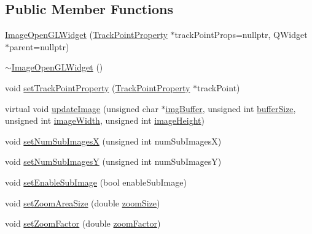\subsection*{Public Member Functions}
\begin{DoxyCompactItemize}
\item 
\mbox{\hyperlink{class_image_open_g_l_widget_a7d4da279a6dc2a37cdceb4d32233ecbd}{Image\+Open\+G\+L\+Widget}} (\mbox{\hyperlink{struct_track_point_property}{Track\+Point\+Property}} $\ast$track\+Point\+Props=nullptr, Q\+Widget $\ast$parent=nullptr)
\item 
\mbox{\hyperlink{class_image_open_g_l_widget_a3e1ff39cc67dc55a2240833810370aa7}{$\sim$\+Image\+Open\+G\+L\+Widget}} ()
\item 
void \mbox{\hyperlink{class_image_open_g_l_widget_a9f92b0518343d716a79e4f4958970b5f}{set\+Track\+Point\+Property}} (\mbox{\hyperlink{struct_track_point_property}{Track\+Point\+Property}} $\ast$track\+Point)
\item 
virtual void \mbox{\hyperlink{class_image_open_g_l_widget_abb7d20bc625fc370bf2757a9ec3c1ac3}{update\+Image}} (unsigned char $\ast$\mbox{\hyperlink{class_image_open_g_l_widget_a52ca337428d317ca2765cdf4d95e1b43}{img\+Buffer}}, unsigned int \mbox{\hyperlink{class_image_open_g_l_widget_a2c22ecc7b2355c66ed8d7ca6d824404e}{buffer\+Size}}, unsigned int \mbox{\hyperlink{class_image_open_g_l_widget_a8c3fbf15ba41c21741f8916079f5b6c3}{image\+Width}}, unsigned int \mbox{\hyperlink{class_image_open_g_l_widget_a30f0fce34d5d14972dce2c2d534aa692}{image\+Height}})
\item 
void \mbox{\hyperlink{class_image_open_g_l_widget_ac8bb2a294c8c164bcbca358ceaf0140a}{set\+Num\+Sub\+ImagesX}} (unsigned int num\+Sub\+ImagesX)
\item 
void \mbox{\hyperlink{class_image_open_g_l_widget_af7165f96bb82f81eafdadab6621cc2f4}{set\+Num\+Sub\+ImagesY}} (unsigned int num\+Sub\+ImagesY)
\item 
void \mbox{\hyperlink{class_image_open_g_l_widget_aa31585e01f544f1cdb3354e47a1e32bd}{set\+Enable\+Sub\+Image}} (bool enable\+Sub\+Image)
\item 
void \mbox{\hyperlink{class_image_open_g_l_widget_a874c34093bdf9ca318fe8283b610f1ee}{set\+Zoom\+Area\+Size}} (double \mbox{\hyperlink{class_image_open_g_l_widget_ad8c3b1eb294a2dba58026490f1c46aed}{zoom\+Size}})
\item 
void \mbox{\hyperlink{class_image_open_g_l_widget_a65cd3ee1761e0960b41ba3dcbd834294}{set\+Zoom\+Factor}} (double \mbox{\hyperlink{class_image_open_g_l_widget_acbc58856739558290b873f3266ae2939}{zoom\+Factor}})

\end{DoxyCompactItemize}
